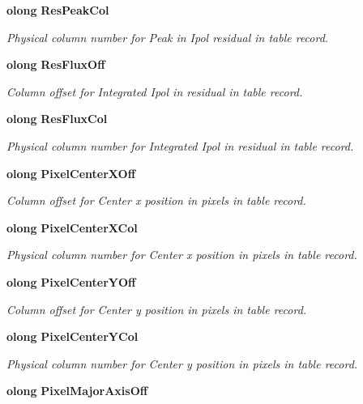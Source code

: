 \begin{CompactItemize}
{\bf olong} {\bf Res\-Peak\-Col}
\begin{CompactList}\small\item\em Physical column number for Peak in Ipol residual in table record. \item\end{CompactList}\item 
{\bf olong} {\bf Res\-Flux\-Off}
\begin{CompactList}\small\item\em Column offset for Integrated Ipol in residual in table record. \item\end{CompactList}\item 
{\bf olong} {\bf Res\-Flux\-Col}
\begin{CompactList}\small\item\em Physical column number for Integrated Ipol in residual in table record. \item\end{CompactList}\item 
{\bf olong} {\bf Pixel\-Center\-XOff}
\begin{CompactList}\small\item\em Column offset for Center x position in pixels in table record. \item\end{CompactList}\item 
{\bf olong} {\bf Pixel\-Center\-XCol}
\begin{CompactList}\small\item\em Physical column number for Center x position in pixels in table record. \item\end{CompactList}\item 
{\bf olong} {\bf Pixel\-Center\-YOff}
\begin{CompactList}\small\item\em Column offset for Center y position in pixels in table record. \item\end{CompactList}\item 
{\bf olong} {\bf Pixel\-Center\-YCol}
\begin{CompactList}\small\item\em Physical column number for Center y position in pixels in table record. \item\end{CompactList}\item 
{\bf olong} {\bf Pixel\-Major\-Axis\-Off}

\end{CompactItemize}

